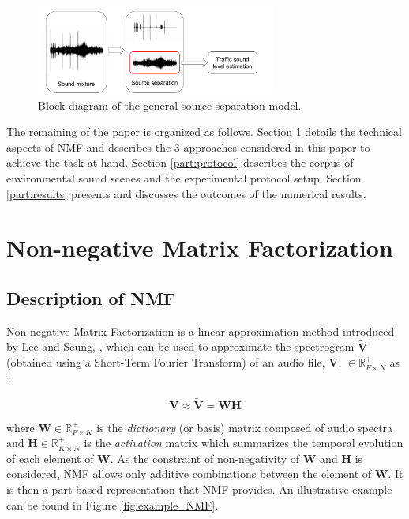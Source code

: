 \documentclass[twocolumn,a4paper,10pt]{article}
\begin{document}
\begin{figure}[t]
\centering
\includegraphics[width=0.7\textwidth]{figures/bloc_diagram_source_separation.pdf}
\caption{Block diagram of the general source separation model.}
\label{fig:diagram}
\end{figure}

The remaining of the paper is organized as follows. Section \ref{part:nmf} details the technical aspects of NMF and describes the 3 approaches considered in this paper to achieve the task at hand. Section \ref{part:protocol} describes the corpus of environmental sound scenes and the experimental protocol setup. Section \ref{part:results} presents and discusses the outcomes of the numerical results.

\section{Non-negative Matrix Factorization}\label{part:nmf}
\subsection{Description of NMF}

Non-negative Matrix Factorization is a linear approximation method introduced by Lee and Seung, \cite{lee_learning_1999}, which can be used to approximate the spectrogram $\mathbf{\tilde{V}}$ (obtained using a Short-Term Fourier Transform) of an audio file, $\mathbf{V}$, $\in \mathbb{R}^+_{F \times N}$ as :

\begin{equation}\label{eq:nmf}
\mathbf{V} \approx \mathbf{\tilde{V}} = \mathbf{WH}
\end{equation}

where $\mathbf{W} \in \mathbb{R}^+_{F \times K}$ is the \textit{dictionary} (or basis) matrix composed of audio spectra and $\mathbf{H} \in \mathbb{R}^+_{K \times N}$ is the \textit{activation} matrix which summarizes the temporal evolution of each element of $\mathbf{W}$. As the constraint of non-negativity of $\mathbf{W}$ and $\mathbf{H}$ is considered, NMF allows only additive combinations between the element of $\mathbf{W}$. It is then a part-based representation that NMF provides. An illustrative example can be found in Figure \ref{fig:example_NMF}.
\end{document}
